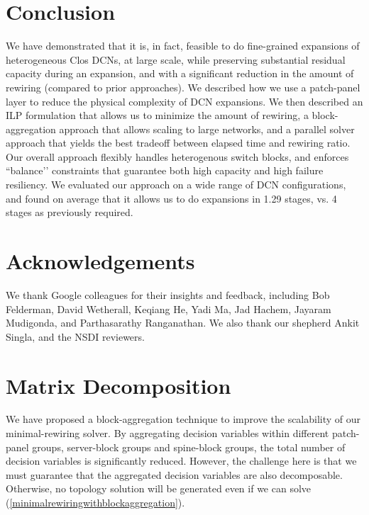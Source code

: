 \documentclass[letterpaper,twocolumn,10pt]{article}
\begin{document}
\section{Conclusion}
We have demonstrated that it is, in fact, feasible to do fine-grained expansions of heterogeneous Clos DCNs, at large scale, while preserving substantial residual capacity during an expansion, and with a significant reduction in the amount of rewiring (compared to prior approaches).  We described how we use a patch-panel layer to reduce the physical complexity of DCN expansions.  We then described an ILP formulation that allows us to minimize the amount of rewiring, a block-aggregation approach that allows scaling to large networks, and a parallel solver approach that yields the best tradeoff between elapsed time and rewiring ratio.   Our overall approach flexibly handles heterogenous switch blocks, and enforces ``balance’’ constraints that guarantee both high capacity and high failure resiliency. We evaluated our approach on a wide range of DCN configurations, and found on average that it allows us to do expansions in 1.29 stages, vs. 4 stages as previously required.

\section{Acknowledgements}
We thank Google colleagues for their insights and feedback, including Bob Felderman, David Wetherall, Keqiang He, Yadi Ma, Jad Hachem, Jayaram Mudigonda, and Parthasarathy Ranganathan. We also thank our shepherd Ankit Singla, and the NSDI reviewers.

\newpage





\clearpage
\appendix

\section{Matrix Decomposition}\label{matrixdecompositionsection}
We have proposed a block-aggregation technique to improve the scalability of our minimal-rewiring solver. By aggregating decision variables within different patch-panel groups, server-block groups and spine-block groups, the total number of decision variables is significantly reduced. However, the challenge here is that we must guarantee that the aggregated decision variables are also decomposable. Otherwise, no topology solution will be generated even if we can solve (\ref{minimalrewiringwithblockaggregation}).
\end{document}
